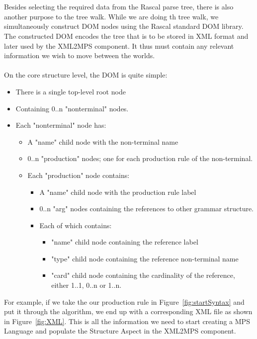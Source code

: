 \documentclass[a4paper]{article}
\begin{document}
\\\\
Besides selecting the required data from the Rascal parse tree, there is also another purpose to the tree walk. While we are doing th  tree walk, we simultaneously construct DOM nodes using the Rascal standard DOM library. 
The constructed DOM encodes the tree that is to be stored in XML format and later used by the XML2MPS component. It thus must contain any relevant information we wish to move between the worlds. 
\\\\
On the core structure level, the DOM is quite simple:
\begin{itemize}
	\item There is a single top-level root node
	\item Containing 0..n "nonterminal" nodes.
	\item Each "nonterminal" node has:
	\begin{itemize}
		\item A "name" child node with the non-terminal name
		\item 0..n "production" nodes; one for each production rule of the non-terminal.
		\item Each "production" node contains:
		\begin{itemize}
			\item  A "name" child node with the production rule label
			\item 0..n "arg" nodes containing the references to other grammar structure.
			\item Each of which contains:
			\begin{itemize}
				\item "name" child node containing the reference label
				\item "type" child node containing the reference non-terminal name
				\item "card" child node containing the cardinality of the reference, either 1..1, 0..n or 1..n.
			\end{itemize}
		\end{itemize}
	\end{itemize}
\end{itemize}

For example, if we take the our production rule in Figure~\ref{fig:startSyntax} and put it through the algorithm, we end up with a corresponding XML file as shown in Figure~\ref{fig:XML}.  This is all the information we need to start creating a MPS Language and populate the Structure Aspect in the XML2MPS component.
\end{document}
